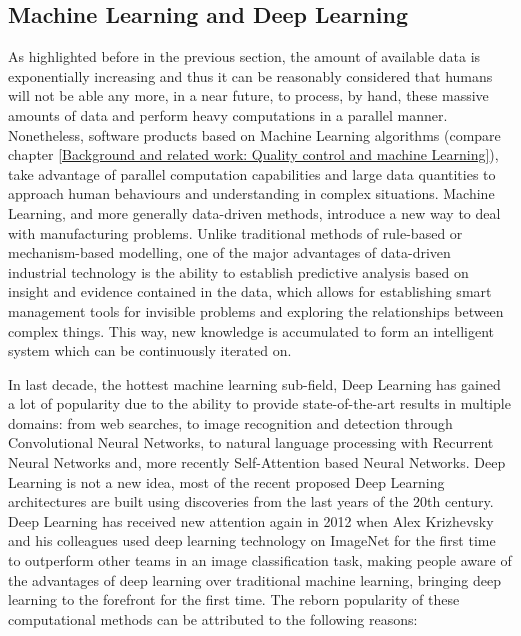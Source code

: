 \subsection{Machine Learning and Deep Learning}

As highlighted before in the previous section, the amount of available data is exponentially increasing and thus it can be reasonably considered that humans will not be able any more, in a near future, to process, by hand, these massive amounts of data and perform heavy computations in a parallel manner. Nonetheless, software products based on Machine Learning algorithms (compare chapter \ref{Background and related work: Quality control and machine Learning}), take advantage of parallel computation capabilities and large data quantities to approach human behaviours and understanding in complex situations. Machine Learning, and more generally data-driven methods, introduce a new way to deal with manufacturing problems. Unlike traditional methods of rule-based or mechanism-based modelling, one of the major advantages of data-driven industrial technology is the ability to establish predictive analysis based on insight and evidence contained in the data, which allows for establishing smart management tools for invisible problems and exploring the relationships between complex things. This way, new knowledge is accumulated to form an intelligent system which can be continuously iterated on.

In last decade, the hottest machine learning sub-field, Deep Learning has gained a lot of popularity due to the ability to provide state-of-the-art results in multiple domains: from web searches, to image recognition and detection through Convolutional Neural Networks, to natural language processing with Recurrent Neural Networks and, more recently Self-Attention based Neural Networks. Deep Learning is not a new idea, most of the recent proposed Deep Learning architectures are built using discoveries from the last years of the 20th century. Deep Learning has received new attention again in 2012 when Alex Krizhevsky and his colleagues used deep learning technology \citep{krizhevsky2012imagenet} on ImageNet for the first time to outperform other teams in an image classification task, making people aware of the advantages of deep learning over traditional machine learning, bringing deep learning to the forefront for the first time. The reborn popularity of these computational methods can be attributed to the following reasons:

